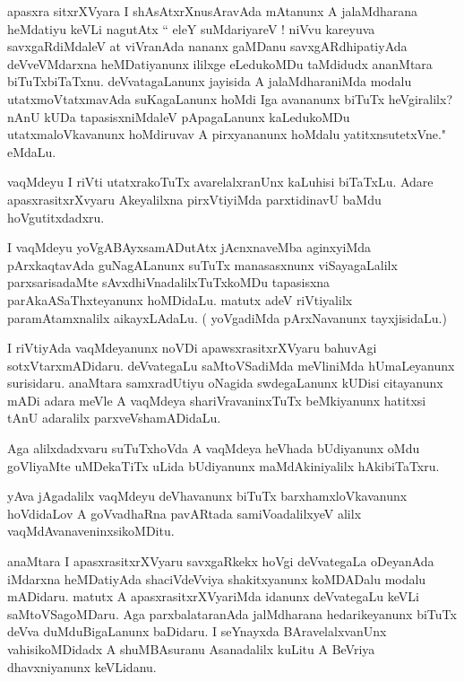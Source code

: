 \documentclass{article}
\begin{document}
\begin{mn}%
apasxra sitxrXVyara I shAsAtxrXnusAravAda mAtanunx A jalaMdharana heMdatiyu keVLi nagutAtx 
`` eleY suMdariyareV ! niVvu kareyuva savxgaRdiMdaleV at viVranAda nananx gaMDanu 
savxgARdhipatiyAda deVveVMdarxna heMDatiyanunx ililxge eLedukoMDu taMdidudx ananMtara 
biTuTxbiTaTxnu. deVvatagaLanunx jayisida A jalaMdharaniMda modalu utatxmoVtatxmavAda 
suKagaLanunx hoMdi Iga avananunx biTuTx heVgiralilx? nAnU kUDa tapasisxniMdaleV 
pApagaLanunx kaLedukoMDu utatxmaloVkavanunx hoMdiruvav A pirxyananunx hoMdalu 
yatitxnsutetxVne." eMdaLu.
\end{mn}

\begin{mn}%
vaqMdeyu I riVti utatxrakoTuTx avarelalxranUnx kaLuhisi biTaTxLu. Adare apasxrasitxrXvyaru 
Akeyalilxna pirxVtiyiMda parxtidinavU baMdu hoVgutitxdadxru.
\end{mn}

\begin{mn}%
I vaqMdeyu yoVgABAyxsamADutAtx jAcnxnaveMba aginxyiMda pArxkaqtavAda guNagALanunx suTuTx 
manasasxnunx viSayagaLalilx parxsarisadaMte sAvxdhiVnadalilxTuTxkoMDu tapasisxna 
parAkaASaThxteyanunx hoMDidaLu. matutx adeV riVtiyalilx paramAtamxnalilx aikayxLAdaLu. ( 
yoVgadiMda pArxNavanunx tayxjisidaLu.)
\end{mn}

\begin{mn}%
I riVtiyAda vaqMdeyanunx noVDi apawsxrasitxrXVyaru bahuvAgi sotxVtarxmADidaru. deVvategaLu 
saMtoVSadiMda meVliniMda hUmaLeyanunx surisidaru. anaMtara samxradUtiyu oNagida 
swdegaLanunx kUDisi citayanunx mADi adara meVle A vaqMdeya shariVravaninxTuTx beMkiyanunx 
hatitxsi tAnU adaralilx parxveVshamADidaLu.
\end{mn}

\begin{mn}%
Aga alilxdadxvaru suTuTxhoVda A vaqMdeya heVhada bUdiyanunx oMdu goVliyaMte uMDekaTiTx uLida 
bUdiyanunx maMdAkiniyalilx hAkibiTaTxru.
\end{mn}

\begin{mn}%
yAva jAgadalilx vaqMdeyu deVhavanunx biTuTx barxhamxloVkavanunx hoVdidaLov A goVvadhaRna 
pavARtada samiVoadalilxyeV alilx vaqMdAvanaveninxsikoMDitu.
\end{mn}

\begin{mn}%
anaMtara I apasxrasitxrXVyaru savxgaRkekx hoVgi deVvategaLa oDeyanAda iMdarxna heMDatiyAda 
shaciVdeVviya shakitxyanunx koMDADalu modalu mADidaru. matutx A apasxrasitxrXVyariMda 
idanunx deVvategaLu keVLi saMtoVSagoMDaru. Aga parxbalataranAda jalMdharana hedarikeyanunx 
biTuTx deVva duMduBigaLanunx baDidaru. I seYnayxda BAravelalxvanUnx vahisikoMDidadx A 
shuMBAsuranu Asanadalilx kuLitu A BeVriya dhavxniyanunx keVLidanu.
\end{mn}
\end{document}
